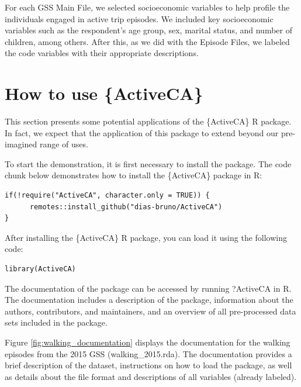 \documentclass[Royal,times,sageh]{sagej}
\begin{document}
For each GSS Main File, we selected socioeconomic variables to help
profile the individuals engaged in active trip episodes. We included key
socioeconomic variables such as the respondent's age group, sex, marital
status, and number of children, among others. After this, as we did with
the Episode Files, we labeled the code variables with their appropriate
descriptions.

\section{How to use \{ActiveCA\}}\label{how-to-use-activeca}

This section presents some potential applications of the \{ActiveCA\} R
package. In fact, we expect that the application of this package to
extend beyond our pre-imagined range of uses.

To start the demonstration, it is first necessary to install the
package. The code chunk below demonstrates how to install the
\{ActiveCA\} package in R:

\begin{verbatim}
if(!require("ActiveCA", character.only = TRUE)) {
      remotes::install_github("dias-bruno/ActiveCA")
}
\end{verbatim}

After installing the \{ActiveCA\} R package, you can load it using the
following code:

\begin{verbatim}
library(ActiveCA)
\end{verbatim}

The documentation of the package can be accessed by running ?ActiveCA in
R. The documentation includes a description of the package, information
about the authors, contributors, and maintainers, and an overview of all
pre-processed data sets included in the package.

Figure \ref{fig:walking_documentation} displays the documentation for
the walking episodes from the 2015 GSS (walking\_2015.rda). The
documentation provides a brief description of the dataset, instructions
on how to load the package, as well as details about the file format and
descriptions of all variables (already labeled).
\end{document}
